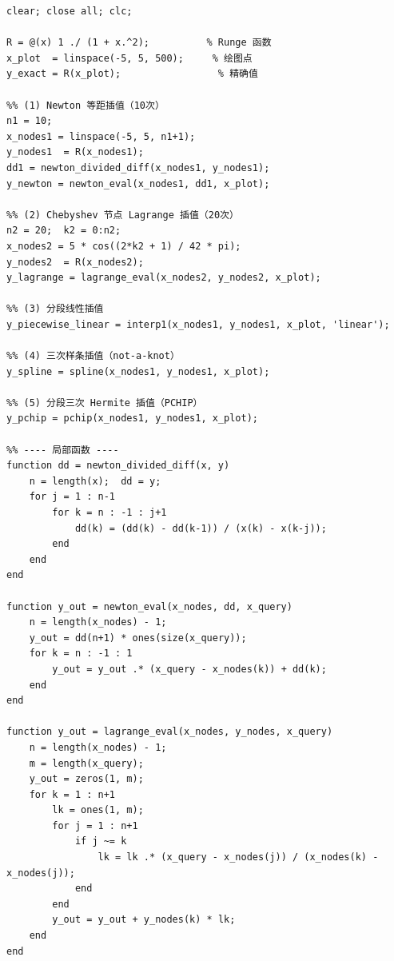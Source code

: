 \documentclass[UTF8,a4paper,11pt]{article}
\begin{document}
\begin{lstlisting}[style=matlab, caption={problem1\_interpolation.m（主程序与辅助函数）}]
clear; close all; clc;

R = @(x) 1 ./ (1 + x.^2);          % Runge 函数
x_plot  = linspace(-5, 5, 500);     % 绘图点
y_exact = R(x_plot);                 % 精确值

%% (1) Newton 等距插值（10次）
n1 = 10;
x_nodes1 = linspace(-5, 5, n1+1);
y_nodes1  = R(x_nodes1);
dd1 = newton_divided_diff(x_nodes1, y_nodes1);
y_newton = newton_eval(x_nodes1, dd1, x_plot);

%% (2) Chebyshev 节点 Lagrange 插值（20次）
n2 = 20;  k2 = 0:n2;
x_nodes2 = 5 * cos((2*k2 + 1) / 42 * pi);
y_nodes2  = R(x_nodes2);
y_lagrange = lagrange_eval(x_nodes2, y_nodes2, x_plot);

%% (3) 分段线性插值
y_piecewise_linear = interp1(x_nodes1, y_nodes1, x_plot, 'linear');

%% (4) 三次样条插值（not-a-knot）
y_spline = spline(x_nodes1, y_nodes1, x_plot);

%% (5) 分段三次 Hermite 插值（PCHIP）
y_pchip = pchip(x_nodes1, y_nodes1, x_plot);

%% ---- 局部函数 ----
function dd = newton_divided_diff(x, y)
    n = length(x);  dd = y;
    for j = 1 : n-1
        for k = n : -1 : j+1
            dd(k) = (dd(k) - dd(k-1)) / (x(k) - x(k-j));
        end
    end
end

function y_out = newton_eval(x_nodes, dd, x_query)
    n = length(x_nodes) - 1;
    y_out = dd(n+1) * ones(size(x_query));
    for k = n : -1 : 1
        y_out = y_out .* (x_query - x_nodes(k)) + dd(k);
    end
end

function y_out = lagrange_eval(x_nodes, y_nodes, x_query)
    n = length(x_nodes) - 1;
    m = length(x_query);
    y_out = zeros(1, m);
    for k = 1 : n+1
        lk = ones(1, m);
        for j = 1 : n+1
            if j ~= k
                lk = lk .* (x_query - x_nodes(j)) / (x_nodes(k) - x_nodes(j));
            end
        end
        y_out = y_out + y_nodes(k) * lk;
    end
end
\end{lstlisting}
\end{document}
